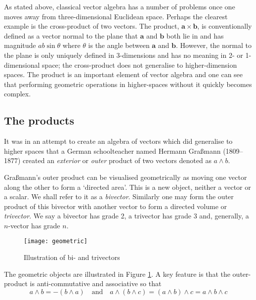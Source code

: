 As stated above, classical vector algebra has a number of problems
once one moves away from three-dimensional Euclidean space. Perhaps the
clearest example is the cross-product of two vectors.  The product, $\mathbf{a}
\times \mathbf{b}$, is conventionally defined as a vector normal to the plane
that $\mathbf{a}$ and $\mathbf{b}$ both lie in and has magnitude $ab\sin\theta$
where $\theta$ is the angle between $\mathbf{a}$ and $\mathbf{b}$. However, the
normal to the plane is only uniquely defined in 3-dimensions and has no meaning
in 2- or 1-dimensional space; the cross-product does not generalise to
higher-dimension spaces. The product is an important element of vector
algebra and one can see that performing geometric operations in higher-spaces
without it quickly becomes complex.

\subsection{The products}

It was in an attempt \cite{GA:grassmann} to create an algebra of vectors which 
did generalise
to higher spaces that a German schoolteacher named Hermann 
Gra{\ss}mann (1809--1877) created an \emph{exterior} 
or \emph{outer} product of two
vectors denoted as $a \wedge b$. 

Gra{\ss}mann's outer product can be visualised geometrically as moving
one vector along the other to form a `directed area'. This is a new object,
neither a vector or a scalar. We shall refer to it as a \emph{bivector}.
Similarly one may form the outer product of this bivector with another
vector to form a directed volume or \emph{trivector}. We say a 
bivector has grade 2, a trivector has grade 3 and, generally, a
$n$-vector has grade $n$.

\begin{figure}
\centering
\texttt{[image: geometric]}
\caption{Illustration of bi- and trivectors\label{fig:geometric}}
\end{figure}

The geometric objects are illustrated in Figure \ref{fig:geometric}. A 
key feature is that the outer-product is anti-commutative and 
associative so that
\begin{displaymath}
a \wedge b = - ( b \wedge a)\quad\mbox{and}\quad 
a \wedge (b \wedge c) = (a \wedge b) \wedge c = a \wedge b \wedge c
\end{displaymath}

